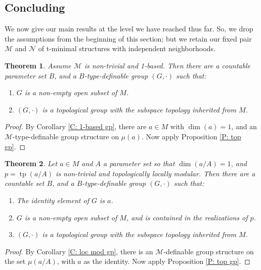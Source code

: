 \documentclass{amsart}
\newtheorem{theorem}{Theorem}[section]
\theoremstyle{definition}
\newcommand{\tp}{\operatorname{tp}}
\begin{document}
\subsection{Concluding}

We now give our main results at the level we have reached thus far. So, we drop the assumptions from the beginning of this section; but we retain our fixed pair $\mathcal M$ and $\mathcal N$ of t-minimal structures with independent neighborhoods.

\begin{theorem}\label{T: top gp 1-based}
    Assume $\mathcal M$ is non-trivial and 1-based. Then there are a countable parameter set $B$, and a $B$-type-definable group $(G,\cdot)$ such that:
    \begin{enumerate}
        \item $G$ is a non-empty open subset of $M$.
        \item $(G,\cdot)$ is a topological group with the subspace topology inherited from $M$.
    \end{enumerate}
\end{theorem}
\begin{proof}
    By Corollary \ref{C: 1-based gp}, there are $a\in M$ with $\dim(a)=1$, and an $\mathcal M$-type-definable group structure on $\mu(a)$. Now apply Proposition \ref{P: top gp}.
\end{proof}

\begin{theorem}\label{T: top gp loc mod}
    Let $a\in M$ and $A$ a parameter set so that $\dim(a/A)=1$, and $p=\tp(a/A)$ is non-trivial and topologically locally modular. Then there are a countable set $B$, and a $B$-type-definable group $(G,\cdot)$ such that:
    \begin{enumerate}
        \item The identity element of $G$ is $a$.
        \item $G$ is a non-empty open subset of $M$, and is contained in the realizations of $p$.
        \item $(G,\cdot)$ is a topological group with the subspace topology inherited from $M$.
    \end{enumerate}
\end{theorem}

\begin{proof}
    By Corollary \ref{C: loc mod gp}, there is an $\mathcal M$-definable group structure on the set $\mu(a/A)$, with $a$ as the identity. Now apply Proposition \ref{P: top gp}.
\end{proof}
\end{document}
